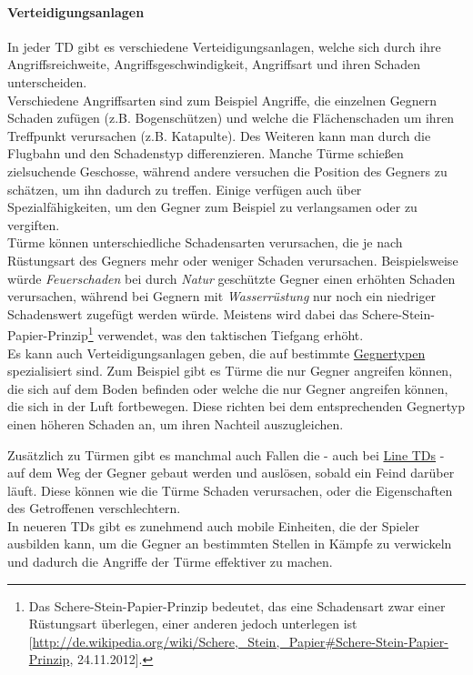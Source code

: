 \paragraph{Verteidigungsanlagen} In jeder TD gibt es verschiedene Verteidigungsanlagen, welche sich durch ihre Angriffsreichweite, Angriffsgeschwindigkeit, Angriffsart und ihren Schaden unterscheiden.\\
Verschiedene Angriffsarten sind zum Beispiel Angriffe, die einzelnen Gegnern Schaden zufügen (z.B. Bogenschützen) und welche die Flächenschaden um ihren Treffpunkt verursachen (z.B. Katapulte). Des Weiteren kann man durch die Flugbahn und den Schadenstyp differenzieren. Manche Türme schießen zielsuchende Geschosse, während andere versuchen die Position des Gegners zu schätzen, um ihn dadurch zu treffen. Einige verfügen auch über Spezialfähigkeiten, um den Gegner zum Beispiel zu verlangsamen oder zu vergiften.\\
Türme können unterschiedliche \hypertarget{Schadensarten}{Schadensarten} verursachen, die je nach Rüstungsart des Gegners mehr oder weniger Schaden verursachen. Beispielsweise würde \textit{Feuerschaden} bei durch \textit{Natur} geschützte Gegner einen erhöhten Schaden verursachen, während bei Gegnern mit \textit{Wasserrüstung} nur noch ein niedriger Schadenswert zugefügt werden würde. Meistens wird dabei das Schere-Stein-Papier-Prinzip\footnote{Das Schere-Stein-Papier-Prinzip bedeutet, das eine Schadensart zwar einer Rüstungsart überlegen, einer anderen jedoch unterlegen ist [\url{http://de.wikipedia.org/wiki/Schere,\_Stein,\_Papier\#Schere-Stein-Papier-Prinzip}, 24.11.2012].} verwendet, was den taktischen Tiefgang erhöht.\\
Es kann auch \hypertarget{DefinitionVerteidungsanlageTypen}{Verteidigungsanlagen} geben, die auf bestimmte \hyperlink{DefintionGegnertypen}{Gegnertypen} spezialisiert sind. Zum Beispiel gibt es Türme die nur Gegner angreifen können, die sich auf dem Boden befinden oder welche die nur Gegner angreifen können, die sich in der Luft fortbewegen. Diese richten bei dem entsprechenden Gegnertyp einen höheren Schaden an, um ihren Nachteil auszugleichen. 

Zusätzlich zu Türmen gibt es manchmal auch Fallen die - auch bei \hyperlink{DefinitionLineTD}{Line TDs} - auf dem Weg der Gegner gebaut werden und auslösen, sobald ein Feind darüber läuft. Diese können wie die Türme Schaden verursachen, oder die Eigenschaften des Getroffenen verschlechtern.\\
In neueren TDs gibt es zunehmend auch \hypertarget{DefinitionMobileEinheit}{mobile Einheiten}, die der Spieler ausbilden kann, um die Gegner an bestimmten Stellen in Kämpfe zu verwickeln und dadurch die Angriffe der Türme effektiver zu machen.

